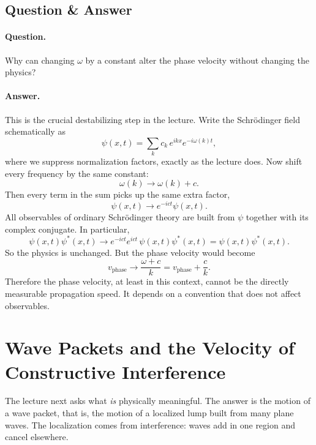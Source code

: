 \subsection{Question \& Answer}

\paragraph{Question.} Why can changing \(\omega\) by a constant alter the phase velocity without changing the physics?

\paragraph{Answer.} This is the crucial destabilizing step in the lecture. Write the Schr\"odinger field schematically as
\begin{equation}
\psi(x,t)=\sum_k c_k\,e^{ikx}e^{-i\omega(k)t},
\end{equation}
where we suppress normalization factors, exactly as the lecture does. Now shift every frequency by the same constant:
\begin{equation}
\omega(k)\longrightarrow \omega(k)+c.
\end{equation}
Then every term in the sum picks up the same extra factor,
\begin{equation}
\psi(x,t)\longrightarrow e^{-ict}\psi(x,t).
\end{equation}
All observables of ordinary Schr\"odinger theory are built from \(\psi\) together with its complex conjugate. In particular,
\begin{equation}
\psi(x,t)\psi^\ast(x,t)\longrightarrow e^{-ict}e^{ict}\,\psi(x,t)\psi^\ast(x,t)=\psi(x,t)\psi^\ast(x,t).
\end{equation}
So the physics is unchanged. But the phase velocity would become
\begin{equation}
v_{\mathrm{phase}}\longrightarrow \frac{\omega+c}{k}=v_{\mathrm{phase}}+\frac{c}{k}.
\end{equation}
Therefore the phase velocity, at least in this context, cannot be the directly measurable propagation speed. It depends on a convention that does not affect observables.

\section{Wave Packets and the Velocity of Constructive Interference}

The lecture next asks what \emph{is} physically meaningful. The answer is the motion of a wave packet, that is, the motion of a localized lump built from many plane waves. The localization comes from interference: waves add in one region and cancel elsewhere.

